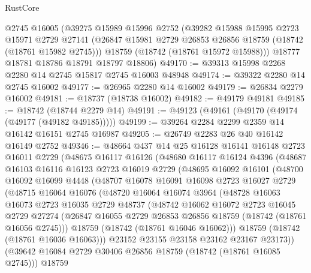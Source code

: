 \begin{lexlean}{RustCore}
\begin{coremodule}
    @2745
    @16005
    (@39275
      @15989
      @15996
      @2752
      (@39282
        @15988
        @15995
        @2723
        @15971
        @2729
        @27141
        (@26847 @15981 @2729 @26853 @26856 @18759 (@18742 (@18761 @15982 @2745)))
        @18759
        (@18742 (@18761 @15972 @15988)))
      @18777
      @18781
      @18786
      @18791
      @18797
      @18806)
@49170 := @39313 @15998 @2268 @2280 @14 @2745 @15817 @2745 @16003 @48948
@49174 := @39322 @2280 @14 @2745 @16002
@49177 := @26965 @2280 @14 @16002
@49179 := @26834 @2279 @16002
@49181 := @18737 (@18738 @16002)
@49182 := @49179 @49181
@49185 := @18742 (@18744 @2279 @14)
@49191 := @49123 (@49161 (@49170 (@49174 (@49177 (@49182 @49185)))))
@49199 := @39264 @2284 @2299 @2359 @14 @16142 @16151 @2745 @16987
@49205 := @26749 @2283 @26 @40 @16142 @16149 @2752
@49346 := @48664
    @437
    @14
    @25
    @16128
    @16141
    @16148
    @2723
    @16011
    @2729
    (@48675
      @16117
      @16126
      (@48680
        @16117
        @16124
        @4396
        (@48687
          @16103
          @16116
          @16123
          @2723
          @16019
          @2729
          (@48695
            @16092
            @16101
            (@48700
              @16092
              @16099
              @4448
              (@48707
                @16078
                @16091
                @16098
                @2723
                @16027
                @2729
                (@48715
                  @16064
                  @16076
                  (@48720
                    @16064
                    @16074
                    @3964
                    (@48728
                      @16063
                      @16073
                      @2723
                      @16035
                      @2729
                      @48737
                      (@48742
                        @16062
                        @16072
                        @2723
                        @16045
                        @2729
                        @27274
                        (@26847 @16055 @2729 @26853 @26856 @18759 (@18742 (@18761 @16056 @2745)))
                        @18759
                        (@18742 (@18761 @16046 @16062)))
                      @18759
                      (@18742 (@18761 @16036 @16063)))
                    @23152
                    @23155
                    @23158
                    @23162
                    @23167
                    @23173))
                (@39642 @16084 @2729 @30406 @26856 @18759 (@18742 (@18761 @16085 @2745)))
                @18759

\end{coremodule}
\end{lexlean}
